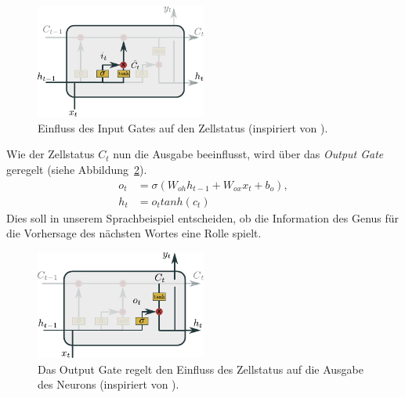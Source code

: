                     \begin{figure}[ht]
                        \centering
                        \includegraphics[width=0.5\textwidth]{images/Illustrationen/LSTM_IG}
                        \caption{Einfluss des Input Gates auf den Zellstatus (inspiriert von \cite{OLAH2015}).}
                        \label{fig:LSTM_Input}
                    \end{figure}
                
                Wie der Zellstatus $C_t$ nun die Ausgabe beeinflusst, wird über das \textit{Output Gate} geregelt (siehe Abbildung~\ref{fig:LSTM_Output}).
                \begin{equation}
                    \begin{split}
                        o_t &= \sigma\left(W_{oh}h_{t-1} + W_{ox}x_t + b_o \right), \\
                        h_t &= o_ttanh\left(c_t\right)
                    \end{split}
                \end{equation}
                Dies soll in unserem Sprachbeispiel entscheiden, ob die Information des Genus für die Vorhersage des nächsten Wortes eine Rolle spielt. \cite{GERS2000} \cite{OLAH2015}

                    \begin{figure}[ht]
                        \centering
                        \includegraphics[width=0.5\textwidth]{images/Illustrationen/LSTM_OG}
                        \caption{Das Output Gate regelt den Einfluss des Zellstatus auf die Ausgabe des Neurons (inspiriert von \cite{OLAH2015}).}
                        \label{fig:LSTM_Output}
                    \end{figure}
                
